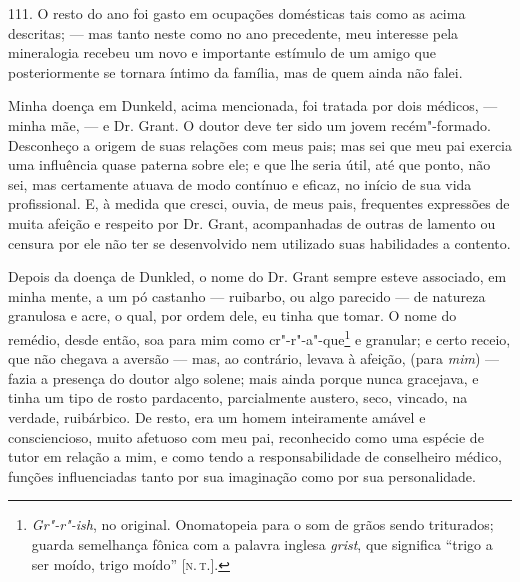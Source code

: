 111. O resto do ano foi gasto em ocupações domésticas tais como as acima
descritas; --- mas tanto neste como no ano precedente, meu interesse pela
mineralogia recebeu um novo e importante estímulo de um amigo que
posteriormente se tornara íntimo da família, mas de quem ainda não
falei.

Minha doença em Dunkeld, acima mencionada, foi tratada por dois médicos,
--- minha mãe, --- e Dr. Grant. O doutor deve ter sido um jovem
recém"-formado. Desconheço a origem de suas relações com meus pais; mas
sei que meu pai exercia uma influência quase paterna sobre ele; e que
lhe seria útil, até que ponto, não sei, mas certamente atuava de modo
contínuo e eficaz, no início de sua vida profissional. E, à medida que
cresci, ouvia, de meus pais, frequentes expressões de muita afeição e
respeito por Dr. Grant, acompanhadas de outras de lamento ou censura por
ele não ter se desenvolvido nem utilizado suas habilidades a contento.

Depois da doença de Dunkled, o nome do Dr. Grant sempre esteve
associado, em minha mente, a um pó castanho --- ruibarbo, ou algo
parecido --- de natureza granulosa e acre, o qual, por ordem dele, eu
tinha que tomar. O nome do remédio, desde então, soa para mim como
cr"-r"-a"-que\footnote{\emph{Gr"-r"-ish}, no original. Onomatopeia para o som
  de grãos sendo triturados; guarda semelhança fônica com a palavra
  inglesa \emph{grist}, que significa ``trigo a ser moído, trigo moído''
  {[}\textsc{n.\,t.}{]}.} e granular; e certo receio, que não chegava a aversão
--- mas, ao contrário, levava à afeição, (para \emph{mim}) --- fazia a
presença do doutor algo solene; mais ainda porque nunca gracejava, e
tinha um tipo de rosto pardacento, parcialmente austero, seco, vincado,
na verdade, ruibárbico. De resto, era um homem inteiramente amável e
consciencioso, muito afetuoso com meu pai, reconhecido como uma espécie
de tutor em relação a mim, e como tendo a responsabilidade de
conselheiro médico, funções influenciadas tanto por sua imaginação como
por sua personalidade.

